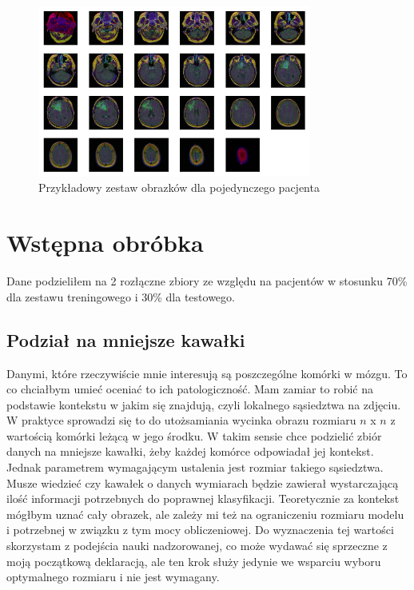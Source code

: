 \begin{figure}[h!]
    \centering
    \includegraphics[width=0.8\textwidth]{images/medical_sample}
    \caption{Przykładowy zestaw obrazków dla pojedynczego pacjenta}
    \label{fig:medical_sample}
\end{figure}

\section{Wstępna obróbka}

Dane podzieliłem na 2 rozłączne zbiory ze względu na pacjentów w stosunku 70\% dla zestawu treningowego i 30\% dla testowego.

\subsection{Podział na mniejsze kawałki}

Danymi, które rzeczywiście mnie interesują są poszczególne komórki w mózgu. To co chciałbym umieć oceniać to ich patologiczność. Mam zamiar to robić na podstawie kontekstu w jakim się znajdują, czyli lokalnego sąsiedztwa na zdjęciu. W praktyce sprowadzi się to do utożsamiania wycinka obrazu rozmiaru $n$ x $n$ z wartością komórki leżącą w jego środku. W takim sensie chce podzielić zbiór danych na mniejsze kawałki, żeby każdej komórce odpowiadał jej kontekst. Jednak parametrem wymagającym ustalenia jest rozmiar takiego sąsiedztwa. Musze wiedzieć czy kawałek o danych wymiarach będzie zawierał wystarczającą ilość informacji potrzebnych do poprawnej klasyfikacji. Teoretycznie za kontekst mógłbym uznać cały obrazek, ale zależy mi też na ograniczeniu rozmiaru modelu i potrzebnej w związku z tym mocy obliczeniowej. Do wyznaczenia tej wartości skorzystam z podejścia nauki nadzorowanej, co może wydawać się sprzeczne z moją początkową deklaracją, ale ten krok służy jedynie we wsparciu wyboru optymalnego rozmiaru i nie jest wymagany.

